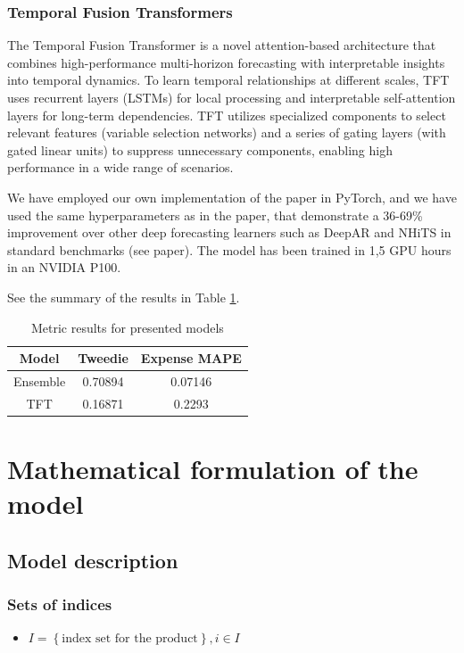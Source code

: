 \documentclass[11pt,twocolumn]{article}
\begin{document}
\subsubsection{Temporal Fusion Transformers}
The Temporal Fusion Transformer \cite{key4} is a novel attention-based architecture that combines high-performance multi-horizon forecasting with interpretable insights into temporal dynamics. To learn temporal relationships at different scales, TFT uses recurrent layers (LSTMs) for local processing and interpretable self-attention layers for long-term dependencies. TFT utilizes specialized components to select relevant features (variable selection networks) and a series of gating layers (with gated linear units) to suppress unnecessary components, enabling high performance in a wide range of scenarios.

We have employed our own implementation of the paper in PyTorch, and we have used the same hyperparameters as in the paper, that demonstrate a 36-69\% improvement over other deep forecasting learners such as DeepAR and NHiTS in standard benchmarks (see paper). The model has been trained in 1,5 GPU hours in an NVIDIA P100.

See the summary of the results in Table \ref{tab:enter-label}.

\begin{table}[h]
	\centering
	\begin{tabular}{|c|c|c|}
		\hline
		Model    & Tweedie & Expense MAPE \\
		\hline
		Ensemble & 0.70894 & 0.07146      \\
		\hline
		TFT      & 0.16871 & 0.2293       \\
		\hline
	\end{tabular}

	\caption{Metric results for presented models}
	\label{tab:enter-label}
\end{table}

\section{Mathematical formulation of the model}
\subsection{Model description}
\subsubsection{Sets of indices}
\begin{itemize}
	\item $I = \left\{ \text{index set for the product} \right\}, i \in I $
\end{itemize}
\end{document}
